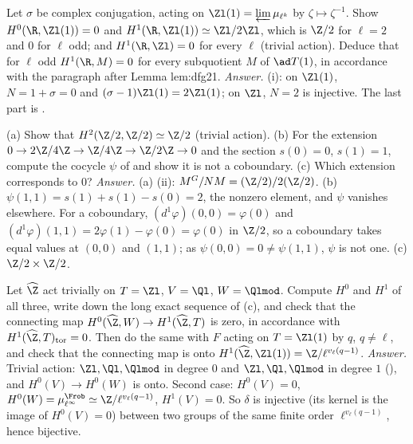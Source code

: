 \begin{exercise}\label{ex:cohomology:real-place-ex}
Let $\sigma$ be complex conjugation, acting on $\Zl(1)=\varprojlim\mu_{\ell^k}$ by $\zeta\mapsto\zeta^{-1}$. Show $H^0(\R,\Zl(1))=0$ and $H^1(\R,\Zl(1))\simeq\Zl/2\Zl$, which is $\Z/2$
for $\ell=2$ and $0$ for $\ell$ odd; and $H^1(\R,\Zl)=0$ for every $\ell$ (trivial action). Deduce that for $\ell$ odd $H^1(\R,M)=0$ for every subquotient $M$ of
$\ad T(1)$, in accordance with the paragraph after Lemma lem:dfg21.
\emph{Answer.} (i): on $\Zl(1)$, $N=1+\sigma=0$ and $(\sigma-1)\Zl(1)=2\Zl(1)$; on $\Zl$, $N=2$ is injective. The last part is
.
\end{exercise}

\begin{exercise}\label{ex:cohomology:z4}
(a) Show that $H^2(\Z/2,\Z/2)\simeq\Z/2$ (trivial action). (b) For the extension $0\to2\Z/4\Z\to\Z/4\Z\to\Z/2\Z\to0$ and the section $s(0)=0$, $s(1)=1$, compute the cocycle
$\psi$ of  and show it is not a coboundary. (c) Which extension corresponds to $0$?
\emph{Answer.} (a) (ii): $M^G/NM=(\Z/2)/2(\Z/2)$. (b) $\psi(1,1)=s(1)+s(1)-s(0)=2$, the nonzero element, and $\psi$ vanishes elsewhere. For a coboundary,
$(d^1\varphi)(0,0)=\varphi(0)$ and $(d^1\varphi)(1,1)=2\varphi(1)-\varphi(0)=\varphi(0)$ in $\Z/2$, so a coboundary takes equal values at $(0,0)$ and $(1,1)$; as
$\psi(0,0)=0\ne\psi(1,1)$, $\psi$ is not one. (c) $\Z/2\times\Z/2$.
\end{exercise}

\begin{exercise}\label{ex:cohomology:tvw}
Let $\widehat\Z$ act trivially on $T=\Zl$, $V=\Ql$, $W=\Qlmod$. Compute $H^0$ and $H^1$ of all three, write down the long exact sequence of
(c), and check that the connecting map $H^0(\widehat\Z,W)\to H^1(\widehat\Z,T)$ is zero, in accordance with $H^1(\widehat\Z,T)_{\mathrm{tor}}=0$.
Then do the same with $F$ acting on $T=\Zl(1)$ by $q$, $q\ne\ell$, and check that the connecting map is onto $H^1(\widehat\Z,\Zl(1))=\Z/\ell^{v_\ell(q-1)}$.
\emph{Answer.} Trivial action: $\Zl,\Ql,\Qlmod$ in degree $0$ and $\Zl,\Ql,\Qlmod$ in degree $1$ (), and $H^0(V)\to H^0(W)$ is onto.
Second case: $H^0(V)=0$, $H^0(W)=\mu_{\ell^\infty}^{\Frob}\simeq\Z/\ell^{v_\ell(q-1)}$, $H^1(V)=0$. So $\delta$ is injective (its kernel is the image of $H^0(V)=0$) between two
groups of the same finite order $\ell^{v_\ell(q-1)}$, hence bijective.
\end{exercise}

